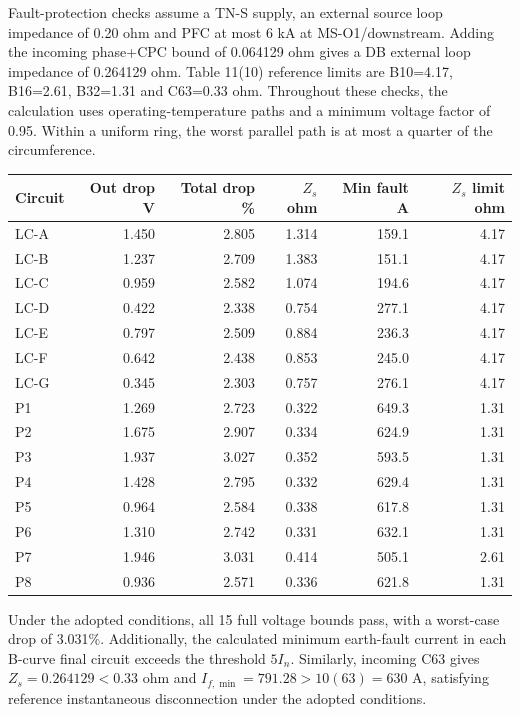 Fault-protection checks assume a TN-S supply, an external source loop impedance of 0.20 ohm and PFC at most 6 kA at MS-O1/downstream.  Adding the incoming phase+CPC bound of 0.064129 ohm gives a DB external loop impedance of 0.264129 ohm. Table 11(10) reference limits are B10=4.17, B16=2.61, B32=1.31 and C63=0.33 ohm. Throughout these checks, the calculation uses operating-temperature paths and a minimum voltage factor of 0.95. Within a uniform ring, the worst parallel path is at most a quarter of the circumference.
\begin{longtable}{lrrrrr}\toprule
Circuit & Out drop V & Total drop \% & $Z_s$ ohm & Min fault A & $Z_s$ limit ohm\\\midrule\endhead

LC-A & 1.450 & 2.805 & 1.314 & 159.1 & 4.17 \\
LC-B & 1.237 & 2.709 & 1.383 & 151.1 & 4.17 \\
LC-C & 0.959 & 2.582 & 1.074 & 194.6 & 4.17 \\
LC-D & 0.422 & 2.338 & 0.754 & 277.1 & 4.17 \\
LC-E & 0.797 & 2.509 & 0.884 & 236.3 & 4.17 \\
LC-F & 0.642 & 2.438 & 0.853 & 245.0 & 4.17 \\
LC-G & 0.345 & 2.303 & 0.757 & 276.1 & 4.17 \\
P1 & 1.269 & 2.723 & 0.322 & 649.3 & 1.31 \\
P2 & 1.675 & 2.907 & 0.334 & 624.9 & 1.31 \\
P3 & 1.937 & 3.027 & 0.352 & 593.5 & 1.31 \\
P4 & 1.428 & 2.795 & 0.332 & 629.4 & 1.31 \\
P5 & 0.964 & 2.584 & 0.338 & 617.8 & 1.31 \\
P6 & 1.310 & 2.742 & 0.331 & 632.1 & 1.31 \\
P7 & 1.946 & 3.031 & 0.414 & 505.1 & 2.61 \\
P8 & 0.936 & 2.571 & 0.336 & 621.8 & 1.31 \\

\bottomrule\end{longtable}
Under the adopted conditions, all 15 full voltage bounds pass, with a worst-case drop of 3.031\%. Additionally, the calculated minimum earth-fault current in each B-curve final circuit exceeds the threshold $5I_n$. Similarly, incoming C63 gives $Z_s=0.264129<0.33$ ohm and $I_{f,\min}=791.28>10(63)=630$ A, satisfying reference instantaneous disconnection under the adopted conditions.
\newpage
